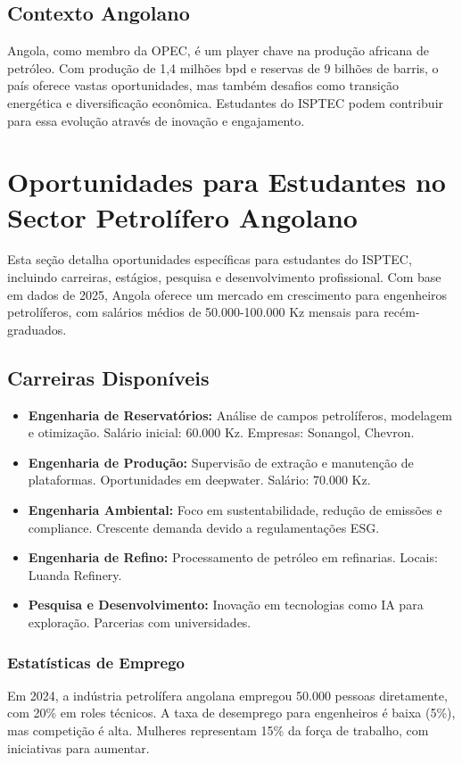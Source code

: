 \documentclass[12pt]{article}
\begin{document}
\subsection{Contexto Angolano}
Angola, como membro da OPEC, é um player chave na produção africana de petróleo. Com produção de 1,4 milhões bpd e reservas de 9 bilhões de barris, o país oferece vastas oportunidades, mas também desafios como transição energética e diversificação econômica. Estudantes do ISPTEC podem contribuir para essa evolução através de inovação e engajamento.

\newpage

\section{Oportunidades para Estudantes no Sector Petrolífero Angolano}

Esta seção detalha oportunidades específicas para estudantes do ISPTEC, incluindo carreiras, estágios, pesquisa e desenvolvimento profissional. Com base em dados de 2025, Angola oferece um mercado em crescimento para engenheiros petrolíferos, com salários médios de 50.000-100.000 Kz mensais para recém-graduados.

\subsection{Carreiras Disponíveis}
\begin{itemize}
    \item \textbf{Engenharia de Reservatórios:} Análise de campos petrolíferos, modelagem e otimização. Salário inicial: 60.000 Kz. Empresas: Sonangol, Chevron.
    \item \textbf{Engenharia de Produção:} Supervisão de extração e manutenção de plataformas. Oportunidades em deepwater. Salário: 70.000 Kz.
    \item \textbf{Engenharia Ambiental:} Foco em sustentabilidade, redução de emissões e compliance. Crescente demanda devido a regulamentações ESG.
    \item \textbf{Engenharia de Refino:} Processamento de petróleo em refinarias. Locais: Luanda Refinery.
    \item \textbf{Pesquisa e Desenvolvimento:} Inovação em tecnologias como IA para exploração. Parcerias com universidades.
\end{itemize}

\subsubsection{Estatísticas de Emprego}
Em 2024, a indústria petrolífera angolana empregou 50.000 pessoas diretamente, com 20\% em roles técnicos. A taxa de desemprego para engenheiros é baixa (5\%), mas competição é alta. Mulheres representam 15\% da força de trabalho, com iniciativas para aumentar.
\end{document}
